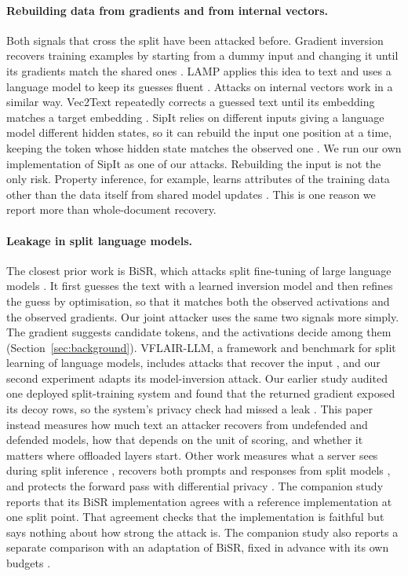 \documentclass[11pt]{article}
\begin{document}
\paragraph{Rebuilding data from gradients and from internal vectors.}
Both signals that cross the split have been attacked before. Gradient inversion recovers training examples by starting from a dummy input and changing it until its gradients match the shared ones \cite{dlg,idlg}. LAMP applies this idea to text and uses a language model to keep its guesses fluent \cite{lamp}. Attacks on internal vectors work in a similar way. Vec2Text repeatedly corrects a guessed text until its embedding matches a target embedding \cite{vec2text}. SipIt relies on different inputs giving a language model different hidden states, so it can rebuild the input one position at a time, keeping the token whose hidden state matches the observed one \cite{sipit}. We run our own implementation of SipIt as one of our attacks. Rebuilding the input is not the only risk. Property inference, for example, learns attributes of the training data other than the data itself from shared model updates \cite{melis2019}. This is one reason we report more than whole-document recovery.

\paragraph{Leakage in split language models.}
The closest prior work is BiSR, which attacks split fine-tuning of large language models \cite{bisr2024}. It first guesses the text with a learned inversion model and then refines the guess by optimisation, so that it matches both the observed activations and the observed gradients. Our joint attacker uses the same two signals more simply. The gradient suggests candidate tokens, and the activations decide among them (Section~\ref{sec:background}). VFLAIR-LLM, a framework and benchmark for split learning of language models, includes attacks that recover the input \cite{vflair}, and our second experiment adapts its model-inversion attack. Our earlier study audited one deployed split-training system and found that the returned gradient exposed its decoy rows, so the system's privacy check had missed a leak \cite{politis2026privacyfailure}. This paper instead measures how much text an attacker recovers from undefended and defended models, how that depends on the unit of scoring, and whether it matters where offloaded layers start. Other work measures what a server sees during split inference \cite{fan2026serversee}, recovers both prompts and responses from split models \cite{gu2026pidi}, and protects the forward pass with differential privacy \cite{dpforward2023}. The companion study reports that its BiSR implementation agrees with a reference implementation at one split point. That agreement checks that the implementation is faithful but says nothing about how strong the attack is. The companion study also reports a separate comparison with an adaptation of BiSR, fixed in advance with its own budgets \cite{llmattacker2026framework}.
\end{document}

